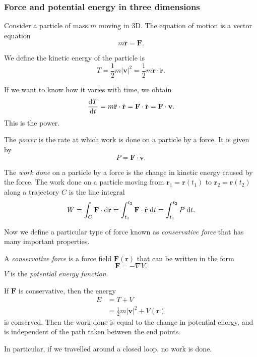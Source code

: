 \documentclass[a4paper]{article}
\begin{document}
\subsubsection{Force and potential energy in three dimensions}
Consider a particle of mass $m$ moving in 3D. The equation of motion is a vector equation
\[
  m\ddot{\mathbf{r}} = \mathbf{F}.
\]
\begin{defi}
  We define the kinetic energy of the particle is
  \[
    T = \frac{1}{2}m|\mathbf{v}|^2 = \frac{1}{2}m\dot{\mathbf{r}}\cdot \dot{\mathbf{r}}.
  \]
\end{defi}
If we want to know how it varies with time, we obtain
\[
  \frac{\mathrm{d} T}{\mathrm{d} t} = m\ddot{\mathbf{r}}\cdot \dot{\mathbf{r}} = \mathbf{F}\cdot \dot{\mathbf{r}} = \mathbf{F}\cdot \mathbf{v}.
\]
This is the power.
\begin{defi}[Power]
  The \emph{power} is the rate at which work is done on a particle by a force. It is given by
  \[
    P = \mathbf{F}\cdot \mathbf{v}.
  \]
\end{defi}
\begin{defi}
  The \emph{work done} on a particle by a force is the change in kinetic energy caused by the force. The work done on a particle moving from $\mathbf{r}_1 = \mathbf{r}(t_1)$ to $\mathbf{r}_2 = \mathbf{r}(t_2)$ along a trajectory $C$ is the line integral
  \[
    W = \int_C \mathbf{F}\cdot\mathrm{d} \mathbf{r} = \int_{t_1}^{t_2} \mathbf{F}\cdot \dot{\mathbf{r}}\;\mathrm{d} t = \int_{t_1}^{t_2} P \;\mathrm{d} t.
  \]
\end{defi}

Now we define a particular type of force known as \emph{conservative force} that has many important properties.
\begin{defi}
  A \emph{conservative force} is a force field $\mathbf{F}(\mathbf{r})$ that can be written in the form
  \[
    \mathbf{F} = -\nabla V.
  \]
  $V$ is the \emph{potential energy function}.
\end{defi}

\begin{prop}
  If $\mathbf{F}$ is conservative, then the energy
  \begin{align*}
    E &= T + V\\
    &= \frac{1}{2}m|\mathbf{v}|^2 + V(\mathbf{r})
  \end{align*}
  is conserved. Then the work done is equal to the change in potential energy, and is independent of the path taken between the end points.

  In particular, if we travelled around a closed loop, no work is done.
\end{prop}
\end{document}
